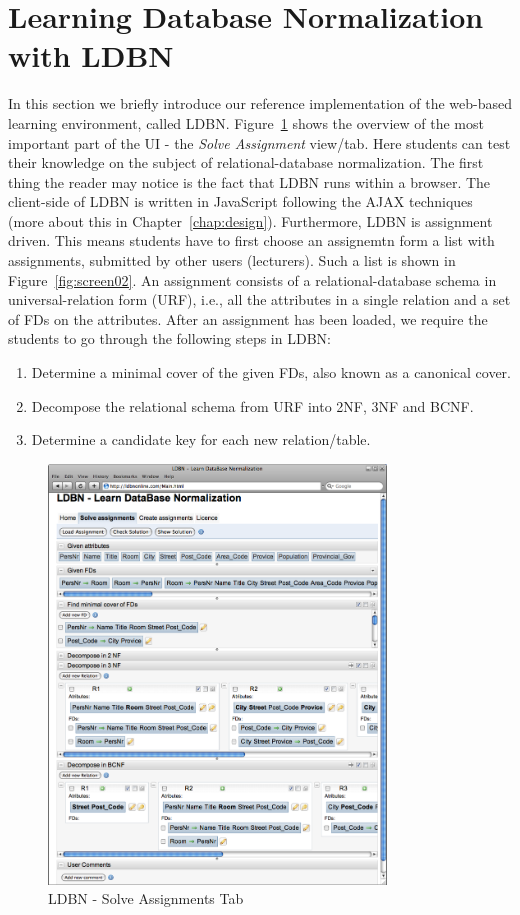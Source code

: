 \section{Learning Database Normalization with LDBN}
\label{sec:introldbn}
In this section we briefly introduce our reference implementation
of the web-based learning environment, called LDBN.    
Figure~\ref{fig:screen01} shows the overview of the most important part of the UI - 
the \textit{Solve Assignment} view/tab. Here students can test their knowledge on 
the subject of relational-database normalization. The first thing the reader 
may notice is the fact that LDBN runs within a browser. The client-side 
of LDBN is written in JavaScript following the AJAX techniques 
(more about this in Chapter~\ref{chap:design}). 
Furthermore, LDBN is assignment driven. This means students have to first 
choose an assignemtn 
form a list with assignments, submitted by other users (lecturers). 
Such a list is shown in Figure~\ref{fig:screen02}. 
An assignment consists of a relational-database schema in
universal-relation form (URF), i.e., all the attributes in a single relation 
and a set of FDs on the attributes. 
After an assignment has been loaded, we require the students to go through the 
following steps in LDBN:
\begin{enumerate}
	\item Determine a minimal cover of the given FDs, also known as a canonical cover.
	\item Decompose the relational schema from URF into 2NF, 3NF and BCNF. 
	\item Determine a candidate key for each new relation/table. 
\end{enumerate}

\begin{figure}[h]
	\begin{center}
		\includegraphics[width=0.8\textwidth]{./img/screen01b.png}
		\caption{LDBN - Solve Assignments Tab}
		\label{fig:screen01}
	\end{center}
\end{figure}

